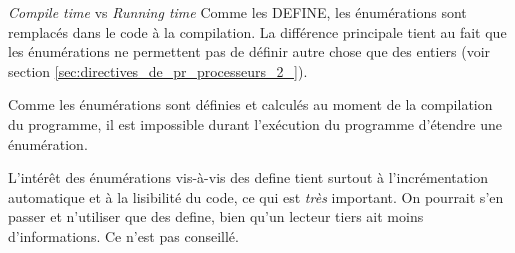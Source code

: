 \documentclass[../../../main.tex]{subfiles}
\begin{document}
\begin{minitelbasicbox}{\textit{Compile time} vs \textit{Running time}}
Comme les \textsf{DEFINE}, les énumérations sont remplacés dans le code à la compilation. La différence principale tient au fait que les énumérations ne permettent pas de définir autre chose que des entiers (voir section \ref{sec:directives_de_pr_processeurs_2_}).

Comme les énumérations sont définies et calculés au moment de la compilation du programme, il est impossible durant l'exécution du programme d'étendre une énumération. 
\end{minitelbasicbox}
L'intérêt des énumérations vis-à-vis des \textsf{define} tient surtout à l'incrémentation automatique et à la lisibilité du code, ce qui est \textit{très} important. On pourrait s'en passer et n'utiliser que des \textsf{define}, bien qu'un lecteur tiers ait moins d'informations. Ce n'est pas conseillé.
\end{document}
